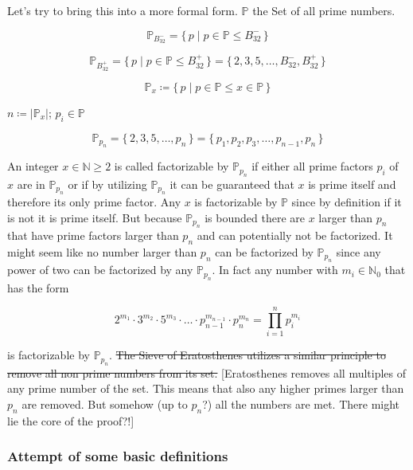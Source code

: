 \documentclass[a4paper,10pt]{article}
\begin{document}

\newcommand{\PP}{\mathbb{P}}
\newcommand{\NN}{\mathbb{N}}
\newcommand{\TT}{\mathbb{T}}
\newcommand{\Bm}[1]{B^-_{32}}
\newcommand{\Bp}[1]{B^+_{32}}
\newcommand{\set}[1]{\lbrace \, {#1} \, \rbrace}
\newcommand{\Set}[2]{\set{ {#1} \;|\; {#2} }}

Let's try to bring this into a more formal form.
$\PP$ the Set of all prime numbers.

$$\PP_{\Bm{32}} = \Set{p}{p \in \PP \leq \Bm{32}}$$

$$\PP_{\Bp{32}} = \Set{p}{p \in \PP \leq \Bp{32}} = \set{2, 3, 5, \dots, \Bm{32}, \Bp{32}}$$

$$\PP_{x} \coloneq \Set{p}{p \in \PP \leq x \in \PP}$$

$n \coloneq |\PP_x|$; $p_i \in \PP$

$$\PP_{p_n}
= \set{2, 3, 5, \dots, p_n}
= \set{p_1, p_2, p_3, \dots, p_{n-1}, p_n}$$

An integer $x \in \NN \geq 2$ is called factorizable by $\PP_{p_n}$
if either all prime factors $p_i$ of $x$ are in $\PP_{p_n}$
or if by utilizing $\PP_{p_n}$ it can be guaranteed that $x$ is prime itself
and therefore its only prime factor.
Any $x$ is factorizable by $\PP$ since by definition
if it is not it is prime itself.
But because $\PP_{p_n}$ is bounded there are $x$ larger than $p_n$
that have prime factors larger than $p_n$ and can potentially not be factorized.
It might seem like no number larger than $p_n$ can be factorized by $\PP_{p_n}$
since any power of two can be factorized by any $\PP_{p_n}$.
In fact any number with $m_i \in \NN_0$ that has the form

$$2^{m_1} \cdot 3^{m_2} \cdot 5^{m_3} \cdot \ldots \cdot p_{n-1}^{m_{n-1}} \cdot p_n^{m_n}
= \prod_{i=1}^n p_i^{m_i} $$

is factorizable by $\PP_{p_n}$.
\st{The Sieve of Eratosthenes utilizes a similar principle
to remove all non prime numbers from its set.}
[Eratosthenes removes all multiples of any prime number of the set.
This means that also any higher primes larger than $p_n$ are removed.
But somehow (up to $p_n$?) all the numbers are met.
There might lie the core of the proof?!]



\subsubsection*{Attempt of some basic definitions}
\end{document}

